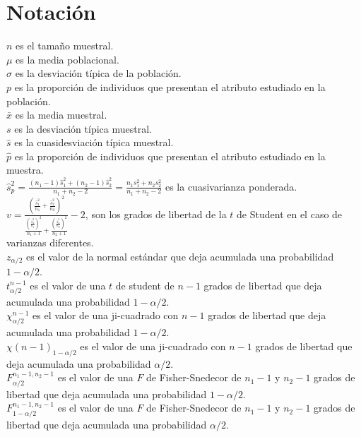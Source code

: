 \documentclass[a4paper,landscape]{article}
\begin{document}
\section*{Notación}
$n$ es el tamaño muestral.\\
$\mu$ es la media poblacional.\\
$\sigma$ es la desviación típica de la población.\\
$p$ es la proporción de individuos que presentan el atributo estudiado en la población.\\
$\bar{x}$ es la media muestral.\\
$s$ es la desviación típica muestral.\\
$\hat s$ es la cuasidesviación típica muestral.\\
$\hat{p}$ es la proporción de individuos que presentan el atributo estudiado en la muestra.\\
$\displaystyle \hat s^2_p=\frac{(n_{1}-1)\hat s^2_1+(n_{2}-1)\hat s^2_2}{n_{1}+n_{2}-2}=
\frac{n_{1}s^2_{1}+n_{2}s^2_{2}}{n_{1}+n_{2}-2}$ es la cuasivarianza ponderada.\\
$v=\frac{\left(\frac{\hat s^2_1}{n_{1}}+
          \frac{\hat s^2_2}{n_{2}}\right)^2}
         {\frac{\left(\frac{\hat s^2_1}{n_{1}}\right)^2}{n_{1}+1}+
          \frac{\left(\frac{\hat s^2_2}{n_{2}}\right)^2}{n_{2}+1}} -2$, son los
          grados de libertad de la $t$ de Student en el caso de varianzas
          diferentes.\\
$z_{\alpha/2}$ es el valor de la normal estándar que deja acumulada
una probabilidad $1-\alpha/2$.\\
$t^{n-1}_{\alpha/2}$ es el valor de una $t$ de student de $n-1$
grados de libertad que deja acumulada una probabilidad
$1-\alpha/2$.\\
$\chi^{n-1}_{\alpha/2}$ es el valor de una ji-cuadrado con $n-1$
grados de libertad que deja acumulada una probabilidad $1-\alpha/2$.\\
$\chi(n-1)_{1-\alpha/2}$ es el valor de una ji-cuadrado con $n-1$
grados de libertad que deja acumulada una probabilidad $\alpha/2$.\\
$F^{n_{1}-1,n_{2}-1}_{\alpha/2}$ es el valor de una $F$ de
Fisher-Snedecor de $n_1-1$ y $n_2-1$ grados de libertad que deja acumulada una
probabilidad $1-\alpha/2$.\\
$F^{n_{1}-1,n_{2}-1}_{1-\alpha/2}$ es el valor de una $F$ de
Fisher-Snedecor de $n_1-1$ y $n_2-1$ grados de libertad que deja acumulada una
probabilidad $\alpha/2$.
\end{document}
